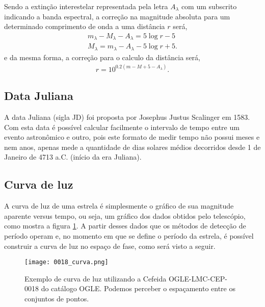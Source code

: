Sendo a extinção interestelar representada pela letra $A_{\lambda}$ com um subscrito indicando a banda espectral, a correção na magnitude absoluta para um determinado comprimento de onda a uma distância $r$ será,
\begin{align}
m_{\lambda} - M_{\lambda} - A_{\lambda} = 5 \log r - 5 \\
M_{\lambda} = m_{\lambda} - A_{\lambda} - 5 \log r + 5.
\end{align} 
e da mesma forma, a correção para o calculo da distância será,
\begin{align}
r = 10^{0.2 \left(m -M + 5 - A_{\lambda} \right)}.
\end{align}


 
\subsection{Data Juliana}

A data Juliana (sigla JD) foi proposta por Josephus Justus Scalinger em 1583. Com esta data é possível calcular facilmente o intervalo de tempo entre um evento astronômico e outro, pois este formato de medir tempo não possui meses e nem anos, apenas mede a quantidade de dias solares médios decorridos desde 1 de Janeiro de 4713 a.C. (início da era Juliana).


\subsection{Curva de luz}

A curva de luz de uma estrela é simplesmente o gráfico de sua magnitude aparente versus tempo, ou seja, um gráfico dos dados obtidos pelo telescópio, como mostra a figura \ref{fig:curva_luz}. A partir desses dados que os métodos de detecção de período operam e, no momento em que se define o período da estrela, é possível construir a curva de luz no espaço de fase, como será visto a seguir.

\begin{figure}[h!]
\centering
\texttt{[image: 0018\_curva.png]}
\caption[Exemplo de curva de luz]{Exemplo de curva de luz utilizando a Cefeida OGLE-LMC-CEP-0018 do catálogo OGLE. Podemos perceber o espaçamento entre os conjuntos de pontos.}
\label{fig:curva_luz}
\end{figure}


